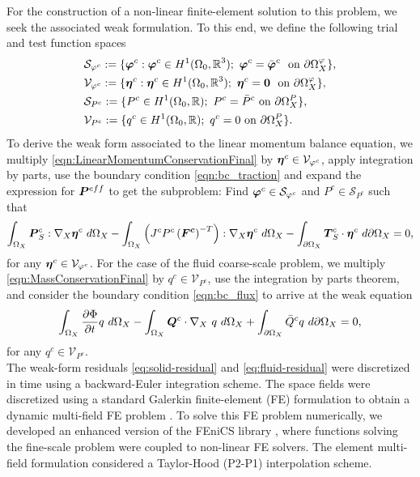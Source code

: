 \documentclass[preprint,3p,12pt,number,sort&compress]{elsarticle}
\def\vec   #1{\text{\boldmath $#1$}{}}
\def\ten   #1{\text{\boldmath $#1$}{}}
\def\R{\mbox{\(\mathbb{R}\)}}
\begin{document}
For the construction of a non-linear finite-element solution to this problem, we seek the associated weak formulation. To this end, we define the following trial and test function spaces 
\begin{align}
&\mathcal{S}_{\varphi^c}:= \{ \vec{\varphi}^c:{\vec{\varphi}^c} \in  H^1(\Omega_0,\R^3) ; \   {\vec{\varphi}}^c =\bar{{\vec{\varphi}}}^c \ ~ \text{on}  ~ \partial \Omega_X^{\varphi} \},\\
&\mathcal{V}_{\varphi^c} := \{  \vec{\eta}^c:\vec{\eta}^c \in  H^1(\Omega_0,\R^3) ; \   {\vec{\eta}}^c =\vec{0} \  ~ \text{on}  ~ \partial \Omega_X^{\varphi} \}, \\
&\mathcal{S}_{P^c}:= \{ P^c \in  H^1(\Omega_0,\R) ; \   P^c=\bar{P} ^c ~ \text{on}  ~\partial \Omega_X^{P} \}, \\
&\mathcal{V}_{P^c} := \{ q^c \in  H^1(\Omega_0,\R) ; \   q^c=0  ~ \text{on}  ~ \partial \Omega_X^{P} \}.
\end{align}
To derive the weak form associated to the linear momentum balance equation, we multiply \eqref{eqn:LinearMomentumConservationFinal} by $\vec{\eta}^c \in \mathcal{V}_{\varphi^c}$,  apply integration by parts,  use the boundary condition \eqref{eqn:bc_traction} and expand the expression for $\ten P^{eff}$ to get the subproblem: Find $\vec{\varphi}^c \in \mathcal{S}_{\varphi^c}$ and $P^c \in \mathcal{S}_{P^c}$ such that
\begin{equation}
	\int_{\Omega_X} \ten P_S^{c} :  \nabla_X \vec{\eta}^c  \ d \Omega_X 
	- \int_{\Omega_X}\left( J^c P^c \left(\ten{F^c}\right)^{-T} \right): \nabla_X \vec{\eta}^c  \ d \Omega_X  
-
	\int_{\partial \Omega_X}  \vec T_S^c \cdot \vec{\eta}^c  \ d \partial \Omega_X=0,
	\label{eq:solid-residual}
\end{equation}
for any $\vec \eta^c \in \mathcal{V}_{\varphi^c}$. For the case of the fluid coarse-scale problem, we multiply \eqref{eqn:MassConservationFinal} by $q^c \in \mathcal{V}_{P^c}$, use the integration by parts theorem, and consider the boundary condition \eqref{eqn:bc_flux} to arrive at the weak equation
\begin{equation}
	\int_{\Omega_X}\frac{\partial \Phi}{\partial t} q  \ d \Omega_X   - \int_{\Omega_X}  \vec Q^c  \cdot \nabla_X \  q \ d \Omega_X +
	\int_{\partial \Omega_X} \bar{Q}^c q\ d \partial \Omega_X =0,
		\label{eq:fluid-residual}
\end{equation}  
for any $q^c \in \mathcal{V}_{P^c}$.\\

The weak-form residuals \eqref{eq:solid-residual} and \eqref{eq:fluid-residual} were discretized in time using a backward-Euler integration scheme. The space fields were discretized using a standard Galerkin finite-element (FE) formulation to obtain a dynamic multi-field FE problem \cite{HurtadoCastroMadrid2017,HurtadoZavala2021}. To solve this FE problem numerically, we developed an enhanced version of the FEniCS library \cite{Fenics2012}, where functions solving the fine-scale problem were coupled to non-linear FE solvers. The element multi-field formulation considered a Taylor-Hood (P2-P1) interpolation scheme.
\end{document}
